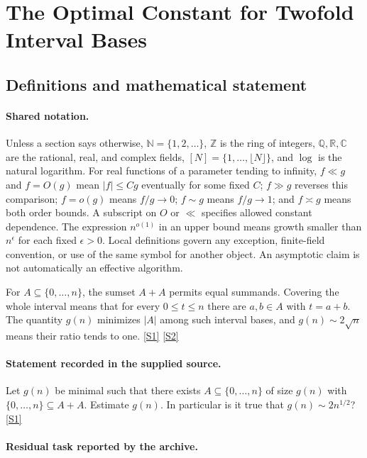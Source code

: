 \documentclass[11pt,a4paper]{article}
\newcommand{\N}{\mathbb{N}}
\newcommand{\Z}{\mathbb{Z}}
\newcommand{\Q}{\mathbb{Q}}
\newcommand{\R}{\mathbb{R}}
\newcommand{\C}{\mathbb{C}}
\newcommand{\sref}[2]{\hyperlink{source:#1:#2}{[S#2]}}
\begin{document}
\section{The Optimal Constant for Twofold Interval Bases}\label{statement}


\subsection{Definitions and mathematical statement}

\paragraph{Shared notation.}Unless a section says otherwise, $\N=\{1,2,\ldots\}$,
$\Z$ is the ring of integers, $\Q,\R,\C$ are the rational, real, and complex
fields, $[N]=\{1,\ldots,\lfloor N\rfloor\}$, and $\log$ is the natural
logarithm. For real functions of a parameter tending to infinity,
$f\ll g$ and $f=O(g)$ mean $|f|\leq Cg$ eventually for some fixed $C$;
$f\gg g$ reverses this comparison; $f=o(g)$ means $f/g\to0$;
$f\sim g$ means $f/g\to1$; and $f\asymp g$ means both order bounds.
A subscript on $O$ or $\ll$ specifies allowed constant dependence.
The expression $n^{o(1)}$ in an upper bound means growth smaller than
$n^\epsilon$ for each fixed $\epsilon>0$. Local definitions govern any
exception, finite-field convention, or use of the same symbol for another
object. An asymptotic claim is not automatically an effective algorithm.



For $A\subseteq\{0,\ldots,n\}$, the sumset $A+A$ permits equal summands. Covering the whole interval means that for every $0\leq t\leq n$ there are $a,b\in A$ with $t=a+b$. The quantity $g(n)$ minimizes $|A|$ among such interval bases, and $g(n)\sim2\sqrt n$ means their ratio tends to one. \sref{statement}{1} \sref{statement}{2}

\paragraph{Statement recorded in the supplied source.}
Let $g(n)$ be minimal such that there exists $A\subseteq \{0,\ldots,n\}$ of size $g(n)$ with $\{0,\ldots,n\}\subseteq A+A$. Estimate $g(n)$. In particular is it true that $g(n)\sim 2n^{1/2}$? \sref{statement}{1}

\paragraph{Residual task reported by the archive.}
\end{document}
